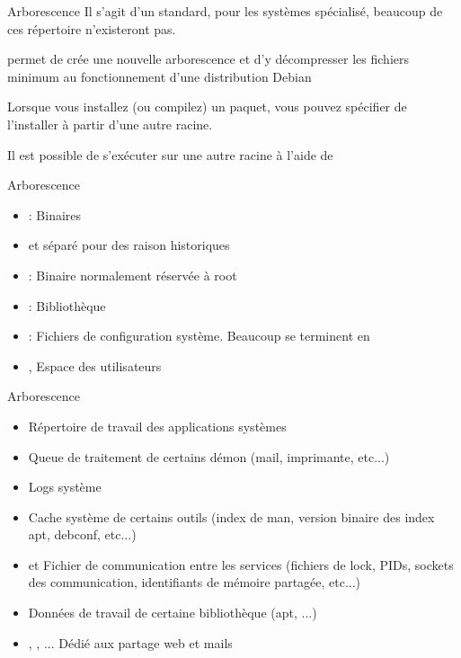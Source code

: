 \begin{frame}[fragile=singleslide]{Arborescence}
  Il s'agit  d'un standard, pour les systèmes  spécialisé, beaucoup de
  ces répertoire n'existeront pas.

   permet de crée une nouvelle arborescence et d'y
  décompresser   les   fichiers   minimum  au   fonctionnement   d'une
  distribution Debian

  Lorsque  vous  installez  (ou   compilez)  un  paquet,  vous  pouvez
  spécifier de l'installer à partir d'une autre racine.

  Il  est possible  de s'exécuter  sur une  autre racine  à  l'aide de
\end{frame}

\begin{frame}[fragile=singleslide]{Arborescence}
  \begin{itemize}
  \item  {}      :
    Binaires
  \item \file{/} et  séparé pour des raison historiques
  \item {}: Binaire normalement réservée à root
  \item {} : Bibliothèque
  \item {}:  Fichiers de configuration  système.  Beaucoup se
    terminent en 
  \item {},  Espace des utilisateurs
  \end{itemize}
\end{frame}

\begin{frame}[fragile=singleslide]{Arborescence}
  \begin{itemize}
  \item {} Répertoire de travail des applications systèmes
  \item {} Queue de traitement de certains démon (mail,
    imprimante, etc...)
  \item {} Logs système
  \item {}  Cache système de certains  outils (index de
    man, version binaire des index apt, debconf, etc...)
  \item {} et   Fichier de communication entre
    les services  (fichiers de lock, PIDs,  sockets des communication,
    identifiants de mémoire partagée, etc...)
  \item  {} Données de  travail de  certaine bibliothèque
    (apt, ...)
  \item {}, ,  ...  Dédié aux partage web
    et mails
  \end{itemize}
\end{frame}

